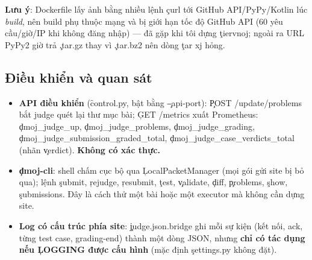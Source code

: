 \textbf{Lưu ý}: Dockerfile lấy ảnh bằng nhiều lệnh \c{curl} tới GitHub API/PyPy/Kotlin lúc \emph{build}, nên build phụ thuộc mạng và bị giới hạn tốc độ GitHub API (60 yêu cầu/giờ/IP khi không đăng nhập) --- đã gặp khi tôi dựng \c{tiervnoj}; ngoài ra URL PyPy2 giờ trả \c{.tar.gz} thay vì \c{.tar.bz2} nên dòng \c{tar xj} hỏng. \tS

\subsection{Điều khiển và quan sát}
\begin{itemize}
\item \textbf{API điều khiển} (\f{control.py}, bật bằng \c{--api-port}): \c{POST /update/problems} bắt judge quét lại thư mục bài; \c{GET /metrics} xuất Prometheus: \c{dmoj_judge_up}, \c{dmoj_judge_problems}, \c{dmoj_judge_grading}, \c{dmoj_judge_submission_graded_total}, \c{dmoj_judge_case_verdicts_total} (nhãn \c{verdict}). \textbf{Không có xác thực.} \tS
\item \textbf{\c{dmoj-cli}}: shell chấm cục bộ qua \c{LocalPacketManager} (mọi gói gửi site bị bỏ qua); lệnh \c{submit}, \c{rejudge}, \c{resubmit}, \c{test}, \c{validate}, \c{diff}, \c{problems}, \c{show}, \c{submissions}. Đây là cách thử một bài hoặc một executor mà không cần dựng site. \tS
\item \textbf{Log có cấu trúc phía site}: \c{judge.json.bridge} ghi mỗi sự kiện (kết nối, ack, từng test case, grading-end) thành một dòng JSON, nhưng \textbf{chỉ có tác dụng nếu \c{LOGGING} được cấu hình} (mặc định \c{settings.py} không đặt). \tS \tI
\end{itemize}
